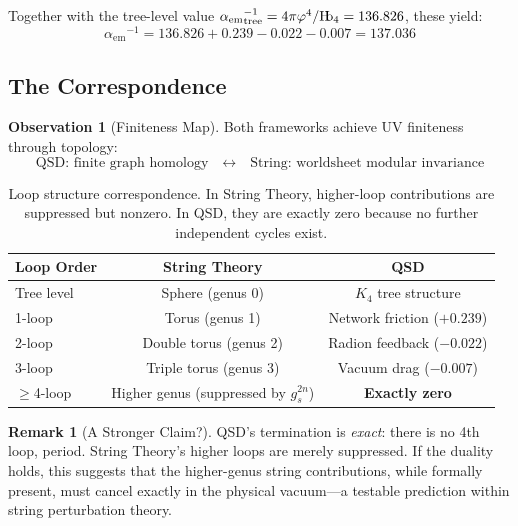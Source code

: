 \documentclass[11pt,a4paper]{article}
\theoremstyle{definition}
\newtheorem{remark}[theorem]{Remark}
\newtheorem{observation}[theorem]{Observation}
\newcommand{\Hb}{\textnormal{H\kern-0.3em b}}
\newcommand{\Hbfour}{\Hb_4}
\newcommand{\gr}{\varphi}
\newcommand{\aem}{{\alpha_{\mathrm{em}}}}
\newcommand{\gs}{g_s}
\begin{document}
Together with the tree-level value $\aem^{-1}_{\text{tree}} = 4\pi\gr^4/\Hbfour
= 136.826$, these yield:
\begin{equation}
\aem^{-1} = 136.826 + 0.239 - 0.022 - 0.007 = 137.036
\end{equation}

\subsection{The Correspondence}

\begin{observation}[Finiteness Map]
\label{obs:finite}
Both frameworks achieve UV finiteness through topology:
\begin{equation}
\text{QSD: finite graph homology} \quad \longleftrightarrow \quad
\text{String: worldsheet modular invariance}
\end{equation}
\end{observation}

\begin{table}[h]
\centering
\begin{tabular}{lcc}
\toprule
\textbf{Loop Order} & \textbf{String Theory} & \textbf{QSD} \\
\midrule
Tree level & Sphere (genus 0) & $K_4$ tree structure \\
1-loop & Torus (genus 1) & Network friction ($+0.239$) \\
2-loop & Double torus (genus 2) & Radion feedback ($-0.022$) \\
3-loop & Triple torus (genus 3) & Vacuum drag ($-0.007$) \\
$\geq$4-loop & Higher genus (suppressed by $\gs^{2n}$) & \textbf{Exactly zero} \\
\bottomrule
\end{tabular}
\caption{Loop structure correspondence.  In String Theory, higher-loop
contributions are suppressed but nonzero.  In QSD, they are exactly zero
because no further independent cycles exist.}
\label{tab:loops}
\end{table}

\begin{remark}[A Stronger Claim?]
QSD's termination is \emph{exact}: there is no 4th loop, period.  String
Theory's higher loops are merely suppressed.  If the duality holds, this
suggests that the higher-genus string contributions, while formally
present, must cancel exactly in the physical vacuum---a testable prediction
within string perturbation theory.
\end{remark}
\end{document}
